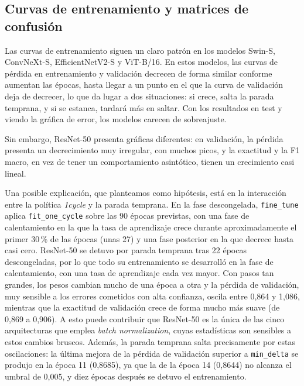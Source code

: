 


\subsection{Curvas de entrenamiento y matrices de confusión}\label{sec:modelos-curvas}


Las curvas de entrenamiento siguen un claro patrón en los modelos Swin-S, ConvNeXt-S, EfficientNetV2-S y ViT-B/16. En estos modelos, las curvas de pérdida en entrenamiento y validación decrecen de forma similar conforme aumentan las épocas, hasta llegar a un punto en el que la curva de validación deja de decrecer, lo que da lugar a dos situaciones: si crece, salta la parada temprana, y si se estanca, tardará más en saltar. Con los resultados en test y viendo la gráfica de error, los modelos carecen de sobreajuste.

Sin embargo, ResNet-50 presenta gráficas diferentes: en validación, la pérdida presenta un decrecimiento muy irregular, con muchos picos, y la exactitud y la F1 macro, en vez de tener un comportamiento asintótico, tienen un crecimiento casi lineal.

Una posible explicación, que planteamos como hipótesis, está en la interacción entre la política \textit{1cycle} y la parada temprana. En la fase descongelada, \texttt{fine\_tune} aplica \texttt{fit\_one\_cycle} sobre las 90 épocas previstas, con una fase de calentamiento en la que la tasa de aprendizaje crece durante aproximadamente el primer 30\,\% de las épocas (unas 27) y una fase posterior en la que decrece hasta casi cero. ResNet-50 se detuvo por parada temprana tras 22 épocas descongeladas, por lo que todo su entrenamiento se desarrolló en la fase de calentamiento, con una tasa de aprendizaje cada vez mayor. Con pasos tan grandes, los pesos cambian mucho de una época a otra y la pérdida de validación, muy sensible a los errores cometidos con alta confianza, oscila entre 0,864 y 1,086, mientras que la exactitud de validación crece de forma mucho más suave (de 0,869 a 0,906). A esto puede contribuir que ResNet-50 es la única de las cinco arquitecturas que emplea \emph{batch normalization}, cuyas estadísticas son sensibles a estos cambios bruscos. Además, la parada temprana salta precisamente por estas oscilaciones: la última mejora de la pérdida de validación superior a \texttt{min\_delta} se produjo en la época 11 (0,8685), ya que la de la época 14 (0,8644) no alcanza el umbral de 0,005, y diez épocas después se detuvo el entrenamiento.

